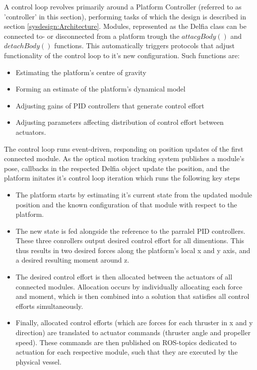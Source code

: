 A control loop revolves primarily around a Platform Controller (referred to as 'controller' in this section), performing tasks of which the design is described in section \ref{sysdesign:Architecture}. Modules, represented as the Delfia class can be connected to- or disconnected from a platform trough the $attacgBody()$ and $detachBody()$ functions. This automatically triggers protocols that adjust functionality of the control loop to it's new configuration. Such functions are: 
\begin{itemize}
	\item Estimating the platform's centre of gravity
	\item Forming an estimate of the platform's dynamical model
	\item Adjusting gains of PID controllers that generate control effort
	\item Adjusting parameters affecting distribution of control effort between actuators.
\end{itemize}

The control loop runs event-driven, responding on position updates of the first connected module. As the optical motion tracking system publishes a module's pose, callbacks in the respected Delfia object update the position, and the platform initates it's control loop iteration which runs the following key steps
\begin{itemize}
	\item The platform starts by estimating it's current state from the updated module position and the known configuration of that module with respect to the platform. 
	\item The new state is fed alongside the reference to the parralel PID controllers. These three conrollers output desired control effort for all dimentions. This thus results in two desired forces along the platform's local x and y axis, and a desired resulting moment around z. 
	\item The desired control effort is then allocated between the actuators of all connected modules. Allocation occurs by individually allocating each force and moment, which is then combined into a solution that satisfies all control efforts simultaneously. 
	\item Finally, allocated control efforts (which are forces for each thruster in x and y direction) are translated to actuator commands (thruster angle and propeller speed). These commands are then published on ROS-topics dedicated to actuation for each respective module, such that they are executed by the physical vessel. 
\end{itemize}

